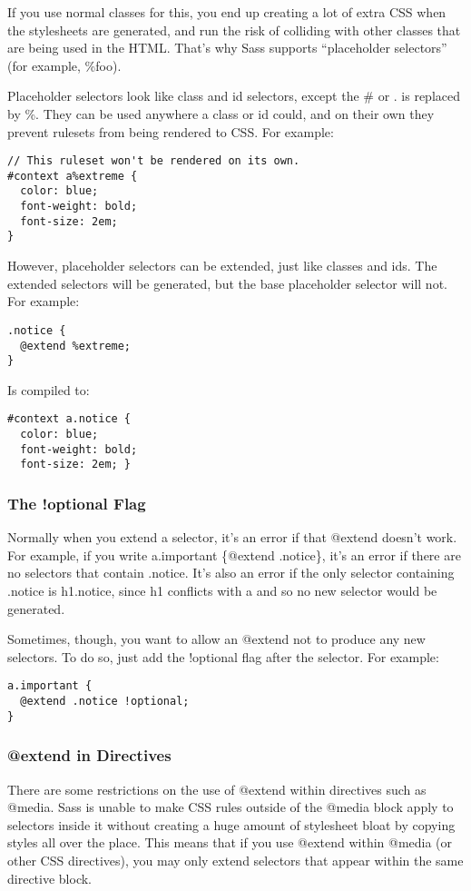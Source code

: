 \documentclass[10pt]{article}
\begin{document}
 If you use normal classes for this, you end up creating a lot of extra CSS when the stylesheets are generated, and run the risk of colliding with other classes that are being used in the HTML. That’s why Sass supports “placeholder selectors” (for example, \%foo).


 Placeholder selectors look like class and id selectors, except the \# or . is replaced by \%. They can be used anywhere a class or id could, and on their own they prevent rulesets from being rendered to CSS. For example:
\begin{verbatim}
// This ruleset won't be rendered on its own.
#context a%extreme {
  color: blue;
  font-weight: bold;
  font-size: 2em;
}
\end{verbatim}


 However, placeholder selectors can be extended, just like classes and ids. The extended selectors will be generated, but the base placeholder selector will not. For example:
\begin{verbatim}
.notice {
  @extend %extreme;
}
\end{verbatim}


 Is compiled to:
\begin{verbatim}
#context a.notice {
  color: blue;
  font-weight: bold;
  font-size: 2em; }
\end{verbatim}
\subsubsection{The !optional Flag}


 Normally when you extend a selector, it’s an error if that @extend doesn’t work. For example, if you write a.important \{@extend .notice\}, it’s an error if there are no selectors that contain .notice. It’s also an error if the only selector containing .notice is h1.notice, since h1 conflicts with a and so no new selector would be generated.


 Sometimes, though, you want to allow an @extend not to produce any new selectors. To do so, just add the !optional flag after the selector. For example:
\begin{verbatim}
a.important {
  @extend .notice !optional;
}
\end{verbatim}
\subsubsection{@extend in Directives}


 There are some restrictions on the use of @extend within directives such as @media. Sass is unable to make CSS rules outside of the @media block apply to selectors inside it without creating a huge amount of stylesheet bloat by copying styles all over the place. This means that if you use @extend within @media (or other CSS directives), you may only extend selectors that appear within the same directive block.
\end{document}
